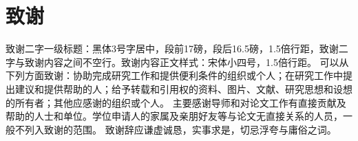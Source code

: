 
\chapter{致谢}

{\songti\xiaosi
致谢二字一级标题：黑体3号字居中，段前17磅，段后16.5磅，1.5倍行距，致谢二字与致谢内容之间不空行。致谢内容正文样式：宋体小四号，1.5倍行距。
可以从下列方面致谢：协助完成研究工作和提供便利条件的组织或个人；在研究工作中提出建议和提供帮助的人；给予转载和引用权的资料、图片、文献、研究思想和设想的所有者；其他应感谢的组织或个人。
主要感谢导师和对论文工作有直接贡献及帮助的人士和单位。学位申请人的家属及亲朋好友等与论文无直接关系的人员，一般不列入致谢的范围。
致谢辞应谦虚诚恳，实事求是，切忌浮夸与庸俗之词。 }



